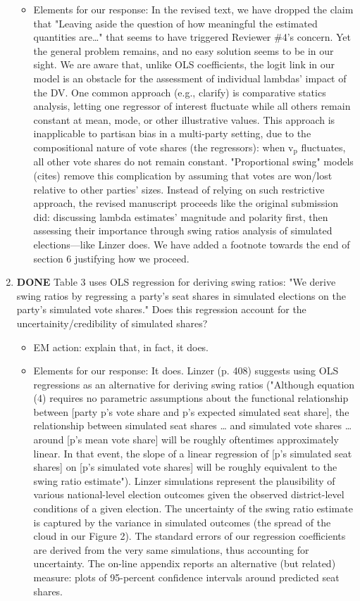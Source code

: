 \documentclass{article}
\begin{document}
\begin{enumerate}
\begin{itemize}
\item Elements for our response: In the revised text, we have dropped the claim that "Leaving aside the question of how meaningful the estimated quantities are\ldots{}" that seems to have triggered Reviewer \#4's concern. Yet the general problem remains, and no easy solution seems to be in our sight. We are aware that, unlike OLS coefficients, the logit link in our model is an obstacle for the assessment of individual lambdas' impact of the DV. One common approach (e.g., clarify) is comparative statics analysis, letting one regressor of interest fluctuate while all others remain constant at mean, mode, or other illustrative values. This approach is inapplicable to partisan bias in a multi-party setting, due to the compositional nature of vote shares (the regressors): when v\(_{\text{p}}\) fluctuates, all other vote shares do not remain constant. "Proportional swing" models (cites) remove this complication by assuming that votes are won/lost relative to other parties' sizes. Instead of relying on such restrictive approach, the revised manuscript proceeds like the original submission did: discussing lambda estimates' magnitude and polarity first, then assessing their importance through swing ratios analysis of simulated elections---like Linzer does. We have added a footnote towards the end of section 6 justifying how we proceed.
\end{itemize}
\item {\bfseries\sffamily DONE} Table 3 uses OLS regression for deriving swing ratios: "We derive swing ratios by regressing a party's seat shares in simulated elections on the party's simulated vote shares." Does this regression account for the uncertainity/credibility of simulated shares?
\label{sec:orgheadline29}
\begin{itemize}
\item EM action: explain that, in fact, it does.
\item Elements for our response: It does. Linzer (p. 408) suggests using OLS regressions as an alternative for deriving swing ratios ("Although equation (4) requires no parametric assumptions about the functional relationship between [party p's vote share and p's expected simulated seat share], the relationship between simulated seat shares \ldots{} and simulated vote shares \ldots{} around [p's mean vote share] will be roughly oftentimes approximately linear. In that event, the slope of a linear regression of [p's simulated seat shares] on [p's simulated vote shares] will be roughly equivalent to the swing ratio estimate"). Linzer simulations represent the plausibility of various national-level election outcomes given the observed district-level conditions of a given election. The uncertainty of the swing ratio estimate is captured by the variance in simulated outcomes (the spread of the cloud in our Figure 2). The standard errors of our regression coefficients are derived from the very same simulations, thus accounting for uncertainty. The on-line appendix reports an alternative (but related) measure: plots of 95-percent confidence intervals around predicted seat shares.

\end{itemize}
\end{enumerate}
\end{document}
